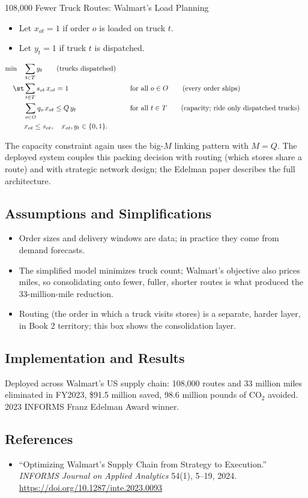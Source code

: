 \begin{casestudybox}{108{,}000 Fewer Truck Routes: Walmart's Load Planning}
\begin{itemize}
\item Let $x_{ot} = 1$ if order $o$ is loaded on truck $t$.
\item Let $y_t = 1$ if truck $t$ is dispatched.
\end{itemize}

\begin{align*}
\min \quad & \sum_{t \in T} y_t   \tag{trucks dispatched} \\
\st        & \sum_{t \in T} s_{ot}\, x_{ot} = 1 &&\quad \text{for all } o \in O   \tag{every order ships} \\
           & \sum_{o \in O} q_o\, x_{ot} \leq Q\, y_t &&\quad \text{for all } t \in T   \tag{capacity; ride only dispatched trucks} \\
           & x_{ot} \leq s_{ot}, \quad x_{ot}, y_t \in \{0,1\}.
\end{align*}

The capacity constraint again uses the big-$M$ linking pattern with $M = Q$.  The deployed system couples this packing decision with routing (which stores share a route) and with strategic network design; the Edelman paper describes the full architecture.

\subsection*{Assumptions and Simplifications}
\begin{itemize}
\item Order sizes and delivery windows are data; in practice they come from demand forecasts.
\item The simplified model minimizes truck count; Walmart's objective also prices miles, so consolidating onto fewer, fuller, shorter routes is what produced the 33-million-mile reduction.
\item Routing (the order in which a truck visits stores) is a separate, harder layer, in Book 2 territory; this box shows the consolidation layer.
\end{itemize}

\subsection*{Implementation and Results}
Deployed across Walmart's US supply chain: 108{,}000 routes and 33 million miles eliminated in FY2023, \$91.5 million saved, 98.6 million pounds of CO$_2$ avoided.  2023 INFORMS Franz Edelman Award winner.

\subsection*{References}
\begin{itemize}
\item ``Optimizing Walmart's Supply Chain from Strategy to Execution.'' \emph{INFORMS Journal on Applied Analytics} 54(1), 5--19, 2024. \url{https://doi.org/10.1287/inte.2023.0093}
\end{itemize}
\end{casestudybox}

